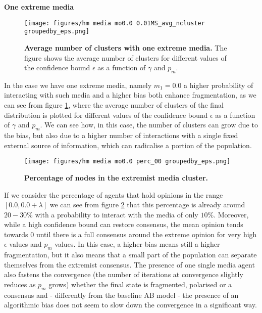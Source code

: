 \documentclass[10pt,letterpaper]{article}
\begin{document}
\textbf{One extreme media}
\begin{figure}
    \centering
    \texttt{[image: figures/hm media mo0.0 0.01MS\_avg\_ncluster groupedby\_eps.png]}
    \caption{\textbf{Average number of clusters with one extreme media.} The figure shows the average number of clusters for different values of the confidence bound $\epsilon$ as a function of $\gamma$ and $p_m$.}
    \label{fig:00ncluster}
\end{figure}

In the case we have one extreme media, namely $m_1 = 0.0$ a higher probability of interacting with such media and a higher bias both enhance fragmentation, as we can see from figure \ref{fig:00ncluster}, where the average number of clusters of the final distribution is plotted for different values of the confidence bound $\epsilon$ as a function of $\gamma$ and $p_m$. We can see how, in this case, the number of clusters can grow due to the bias, but also due to a higher number of interactions with a single fixed external source of information, which can radicalise a portion of the population. 
\begin{figure}
    \centering
    \texttt{[image: figures/hm media mo0.0 perc\_00 groupedby\_eps.png]}
    \caption{\textbf{Percentage of nodes in the extremist media cluster.}}
    \label{fig:extrnodes}
\end{figure}
If we consider the percentage of agents that hold opinions in the range $[0.0, 0.0+\lambda]$ we can see from figure \ref{fig:extrnodes} that this percentage is already around $20-30\%$ with a probability to interact with the media of only $10\%$. Moreover, while a high confidence bound can restore consensus, the mean opinion tends towards 0 until there is a full consensus around the extreme opinion for very high $\epsilon$ values and $p_m$ values. In this case, a higher bias means still a higher fragmentation, but it also means that a small part of the population can separate themselves from the extremist consensus. The presence of one single media agent also fastens the convergence (the number of iterations at convergence slightly reduces as $p_m$ grows) whether the final state is fragmented, polarised or a consensus and - differently from the baseline AB model - the presence of an algorithmic bias does not seem to slow down the convergence in a significant way. \\ \\
\end{document}
